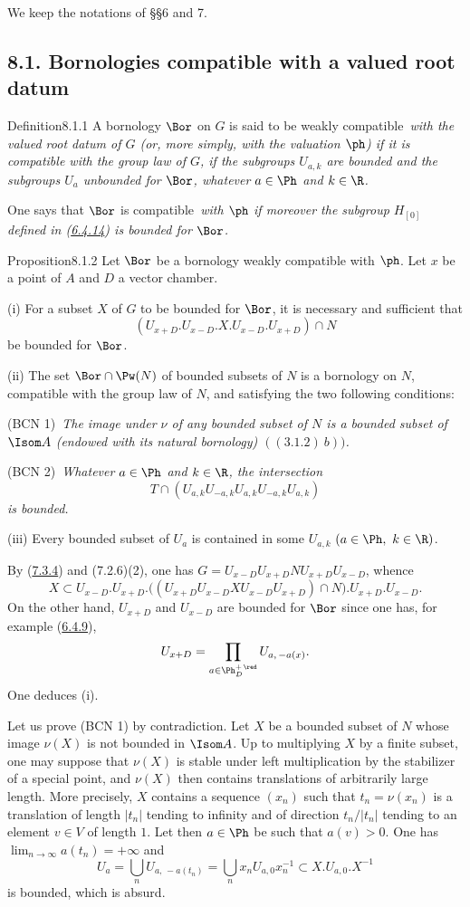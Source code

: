 \documentclass[12pt,a4paper,oneside,english]{smfart}
\makeatletter
\newcommand{\btanchor}[1]{\leavevmode\Hy@raisedlink{\hypertarget{bt:#1}{}}}
\newcommand{\btpageanchor}[1]{\Hy@raisedlink{\hypertarget{p:#1}{}}}
\newcommand{\btref}[1]{\hyperlink{bt:#1}{#1}}
\newcommand{\btpage}[1]{\marginnote{p.~#1}\btpageanchor{#1}}
\newcommand{\pg}[1]{\btpage{#1}}
\newcommand{\btsecB}[2]{%
  \par\needspace{4\baselineskip}\phantomsection
  \subsection*{#2}%
  \ifx\relax#1\relax\else\btanchor{#1}\fi}
\theoremstyle{definition}
\theoremstyle{bt}
\makeatother
\begin{document}
\noindent
We keep the notations of \S\S6 and 7.

\medskip

\btsecB{8.1}{8.1. Bornologies compatible with a valued root datum}

\begin{stmt}{Definition}{8.1.1}\btanchor{8.1.1}
A bornology $\Bor$ on $G$ is said to be \upshape weakly compatible\itshape\ with the
valued root datum of $G$ (or, more simply, with the valuation $\ph$) if it is
compatible with the group law of $G$, if the subgroups $U_{a,k}$ are bounded and the
subgroups $U_a$ unbounded for $\Bor$, whatever $a\in\Ph$ and $k\in\R$.

One says that $\Bor$ is \upshape compatible\itshape\ with $\ph$ if moreover the
subgroup $H_{[0]}$ defined in (\btref{6.4.14}) is bounded for $\Bor$.
\end{stmt}

\begin{stmt}{Proposition}{8.1.2}\btanchor{8.1.2}
Let $\Bor$ be a bornology weakly compatible with $\ph$. Let $x$ be a point of $A$ and
$D$ a vector chamber.

(i) For a subset $X$ of $G$ to be bounded for $\Bor$, it is necessary and sufficient
that
\[
(U_{x+D}.U_{x-D}.X.U_{x-D}.U_{x+D})\cap N
\]
be bounded for $\Bor$.

(ii) The set $\Bor\cap\Pw(N)$ of bounded subsets of $N$ is a bornology on $N$,
compatible with the group law of $N$, and satisfying the two following conditions:

\upshape(BCN 1)\itshape\ The image under $\nu$ of any bounded subset of $N$ is a
bounded subset of $\Isom A$ (endowed with its natural bornology) $((3.1.2)\ b))$.

\upshape(BCN 2)\itshape\ Whatever $a\in\Ph$ and $k\in\R$, the intersection
\[
T\cap(U_{a,k}U_{-a,k}U_{a,k}U_{-a,k}U_{a,k})
\]
is bounded.

(iii) Every bounded subset of $U_a$ is contained in some $U_{a,k}$
$(a\in\Ph,\ k\in\R)$.
\end{stmt}

By (\btref{7.3.4}) and (7.2.6)(2), one has $G=U_{x-D}U_{x+D}NU_{x+D}U_{x-D}$, whence
\[
X\subset U_{x-D}.U_{x+D}.\bigl((U_{x+D}U_{x-D}XU_{x-D}U_{x+D})\cap N\bigr).U_{x+D}.U_{x-D}.
\]
On the other hand, $U_{x+D}$ and $U_{x-D}$ are bounded for $\Bor$ since one has, for
example (\btref{6.4.9}),
\[
U_{x+D}=\prod_{a\in\Ph^{+\,\red}_{D}}U_{a,\,-a(x)} .
\]
One deduces (i).

Let us prove (BCN 1) by contradiction. Let $X$ be a bounded subset of $N$ whose image
$\nu(X)$ is not bounded in $\Isom A$. Up to multiplying $X$ by a finite
\pg{188}
subset, one may suppose that $\nu(X)$ is stable under left multiplication by the
stabilizer of a special point, and $\nu(X)$ then contains translations of arbitrarily
large length. More precisely, $X$ contains a sequence $(x_n)$ such that
$t_n=\nu(x_n)$ is a translation of length $|t_n|$ tending to infinity and of direction
$t_n/|t_n|$ tending to an element $v\in V$ of length $1$. Let then $a\in\Ph$ be such
that $a(v)>0$. One has $\lim_{n\to\infty}a(t_n)=+\infty$ and
\[
U_a=\bigcup_n U_{a,\,-a(t_n)}=\bigcup_n x_nU_{a,0}x_n^{-1}\subset X.U_{a,0}.X^{-1}
\]
is bounded, which is absurd.
\end{document}
